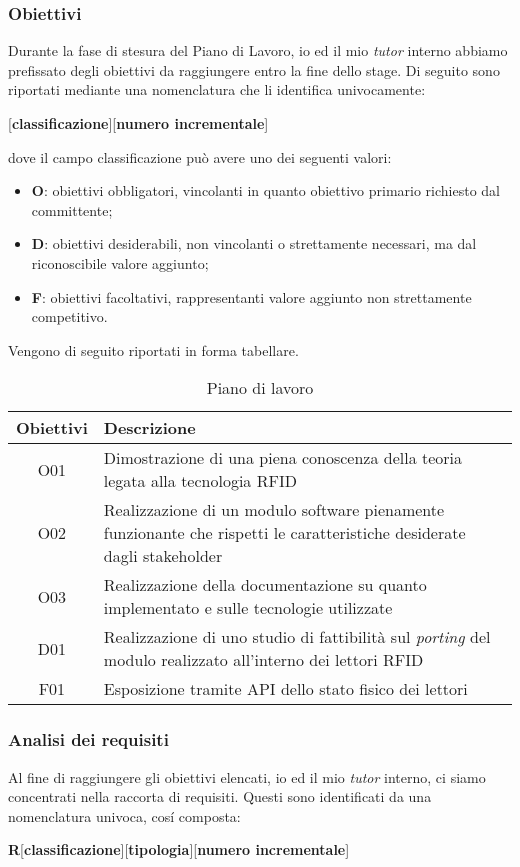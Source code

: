 \subsubsection*{Obiettivi}
\label{sub-sub-sec:obiettivi-cap-3}
Durante la fase di stesura del Piano di Lavoro, io ed il mio \emph{tutor} interno abbiamo prefissato degli obiettivi da raggiungere entro la fine dello stage.
Di seguito sono riportati mediante una nomenclatura che li identifica univocamente:
\begin{center}
    [\textbf{classificazione}][\textbf{numero incrementale}]
\end{center}
dove il campo classificazione può avere uno dei seguenti valori:
\begin{itemize}
    \item \textbf{O}: obiettivi obbligatori, vincolanti in quanto obiettivo primario richiesto dal committente;
    \item \textbf{D}: obiettivi desiderabili, non vincolanti o strettamente necessari, ma dal riconoscibile valore aggiunto;
    \item \textbf{F}: obiettivi facoltativi, rappresentanti valore aggiunto non strettamente competitivo.
\end{itemize}
Vengono di seguito riportati in forma tabellare.
\begin{table}[h!]
    \label{tab:obiettivi}
    \begin{tabularx}{\textwidth}{ | c | X |}
    \hline
    \textbf{Obiettivi} & \textbf{Descrizione}\\
    \hline
    O01 & Dimostrazione di una piena conoscenza della teoria legata alla tecnologia RFID \\
    \hline
    O02 & Realizzazione di un modulo software pienamente funzionante che rispetti le caratteristiche desiderate dagli stakeholder \\
    \hline
    O03 & Realizzazione della documentazione su quanto implementato e sulle tecnologie utilizzate \\
    \hline
    D01 & Realizzazione di uno studio di fattibilità sul \emph{porting} del modulo realizzato all'interno dei lettori RFID \\
    \hline
    F01 & Esposizione tramite API dello stato fisico dei lettori \\
    \hline
    \end{tabularx}
    \caption{Piano di lavoro}
\end{table}

\subsubsection*{Analisi dei requisiti}
\label{sub-sec:req}
Al fine di raggiungere gli obiettivi elencati, io ed il mio \emph{tutor} interno, ci siamo concentrati nella raccorta di requisiti. Questi sono identificati
da una nomenclatura univoca, cosí composta:
\begin{center}
    \textbf{R}[\textbf{classificazione}][\textbf{tipologia}][\textbf{numero incrementale}]
\end{center}

